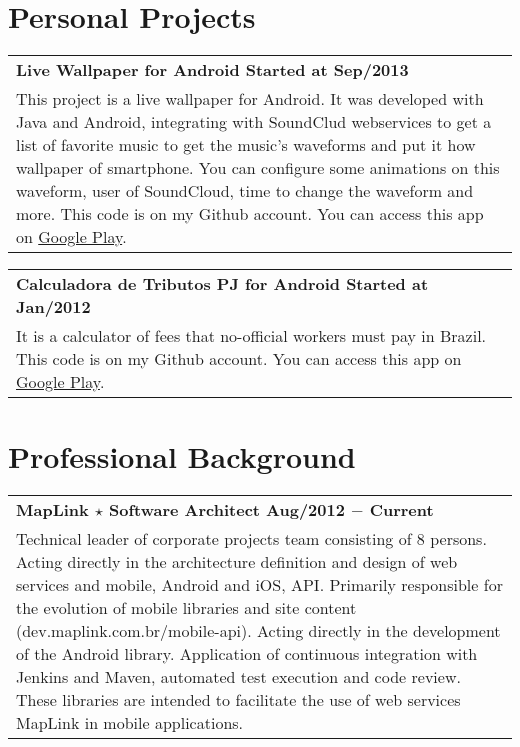 \documentclass[a4paper, oneside, final]{scrartcl}
\newcommand{\vspc}{\vspace{0.15cm}} %
\begin{document}
\begin{center}
\section{Personal Projects}
\begin{tabularx}{1\linewidth}{X}
{\bf Live Wallpaper for Android \hfill Started at Sep/2013} \\
This project is a live wallpaper for Android. It was developed with Java and Android, integrating with SoundClud webservices to get a list of favorite music to get the music's waveforms and put it how wallpaper of smartphone. You can configure some animations on this waveform, user of SoundCloud, time to change the waveform and more. This code is on my Github account. You can access this app on {\href{https://play.google.com/store/apps/details?id=br.com.suelengc.wallpaper}{Google Play}}. \vspc\\
\end{tabularx}

\begin{tabularx}{1\linewidth}{X}
{\bf Calculadora de Tributos PJ for Android \hfill Started at Jan/2012} \\
It is a calculator of fees that no-official workers must pay in Brazil. This code is on my Github account. You can access this app on {\href{https://play.google.com/store/apps/details?id=br.com.suelengc.calctributospj}{Google Play}}.\vspc\\
\end{tabularx}

\section{Professional Background}
\begin{tabularx}{1\linewidth}{X}
{\bf MapLink $\star$ Software Architect \hfill Aug/2012 $-$ Current} \\
Technical leader of corporate projects team consisting of 8 persons. Acting directly in the architecture definition and design of web services and mobile, Android and iOS, API. Primarily responsible for the evolution of mobile libraries and site content (dev.maplink.com.br/mobile-api). Acting directly in the development of the Android library. Application of continuous integration with Jenkins and Maven, automated test execution and code review. These libraries are intended to facilitate the use of web services MapLink in mobile applications. \vspc\\
\end{tabularx}


\end{center}
\end{document}

